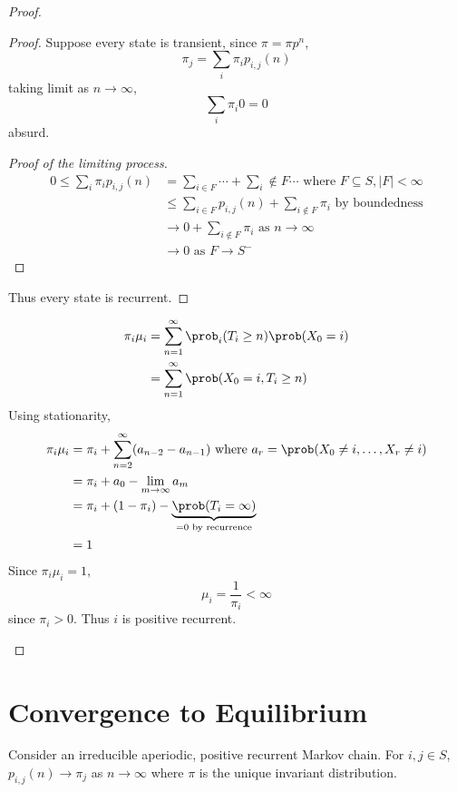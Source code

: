 \documentclass[a4paper]{article}
\begin{document}
\begin{proof}
\begin{enumerate}
\begin{proof}
      Suppose every state is transient, since \(\pi = \pi p^n\),
      \[
        \pi_j = \sum_i \pi_i p_{i, j}(n)
      \]
      taking limit as \(n \to \infty\),
      \[
        \sum_i \pi_i 0 = 0
      \]
      absurd.
      \begin{proof}[Proof of the limiting process]
        \begin{align*}
          0 \leq \sum_i \pi_i p_{i, j}(n) &= \sum_{i \in F} \cdots + \sum_i \notin F \cdots \text{ where } F \subseteq S, |F| < \infty \\
          &\leq \sum_{i \in F} p_{i, j}(n) + \sum_{i \notin F} \pi_i \text{ by boundedness} \\
                                          &\to 0 + \sum_{i \notin F} \pi_i \text{ as } n \to \infty \\
          &\to 0 \text{ as } F \to S^-
        \end{align*}
      \end{proof}
      Thus every state is recurrent.
    \end{proof}
    \begin{align*}
      \pi_i \mu_i &= \sum_{n = 1}^{\infty} \prob_i(T_i \geq n) \prob(X_0 = i) \\
                  &= \sum_{n = 1}^{\infty} \prob(X_0 = i, T_i \geq n) 
    \end{align*}
    Using stationarity,
    \begin{align*}
      \pi_i \mu_i &= \pi_i + \sum_{n = 2}^{\infty} (a_{n - 2} - a_{n - 1}) \text{ where } a_r = \prob(X_0 \neq i, \dots, X_r \neq i) \\
                  &= \pi_i + a_0 - \lim_{m \to \infty} a_m \\
                  &= \pi_i + (1 - \pi_i) - \underbrace{\prob(T_i = \infty)}_{= 0 \text{ by recurrence}} \\
                  &= 1
    \end{align*}
    Since \(\pi_i\mu_i = 1\),
    \[
      \mu_i = \frac{1}{\pi_i} < \infty
    \]
    since \(\pi_i > 0\). Thus \(i\) is positive recurrent.
  \end{enumerate}
\end{proof}

\section{Convergence to Equilibrium}

\begin{theorem}
  Consider an irreducible aperiodic, positive recurrent Markov chain. For \(i, j \in S\), \(p_{i, j}(n) \to \pi_j\) as \(n \to \infty\) where \(\pi\) is the unique invariant distribution.
\end{theorem}
\end{document}

